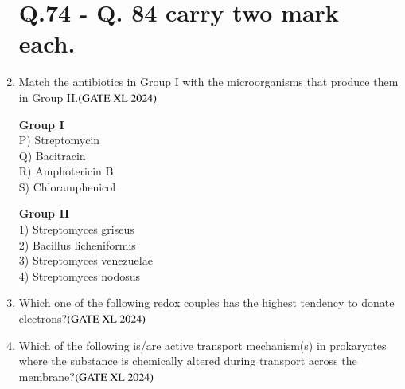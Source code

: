 \documentclass[journal]{IEEEtran}
\begin{document}
\begin{enumerate}
\section*{Q.74 - Q. 84 carry two mark each.} 
    \item Match the antibiotics in Group I with the microorganisms that produce them in Group II.\hfill $\left(\text{GATE XL 2024}\right)$
    \begin{multicols}{2}
    \noindent \textbf{Group I} \\
    P) Streptomycin \\
    Q) Bacitracin \\
    R) Amphotericin B \\
    S) Chloramphenicol \\

    \columnbreak

    \noindent \textbf{Group II} \\
    1) Streptomyces griseus \\
    2) Bacillus licheniformis \\
    3) Streptomyces venezuelae \\
    4) Streptomyces nodosus \\
    \end{multicols}

    \item Which one of the following redox couples has the highest tendency to donate electrons?\hfill $\left(\text{GATE XL 2024}\right)$
    \begin{enumerate}
    \end{enumerate}

    \item Which of the following is/are active transport mechanism(s) in prokaryotes where the substance is chemically altered during transport across the membrane?\hfill $\left(\text{GATE XL 2024}\right)$
    \begin{enumerate}
    \end{enumerate}


\end{enumerate}
\end{document}
